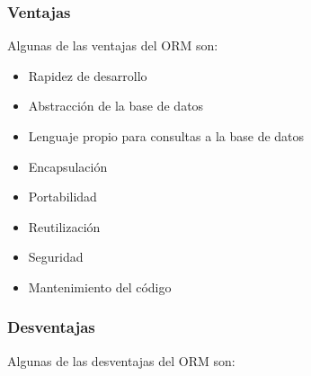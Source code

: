 \documentclass[preprint,12pt]{elsarticle}
\begin{document}
\subsubsection{\textbf{Ventajas}}
Algunas de las ventajas del ORM son: \cite{Borja2010} \cite{Polo2013} 

\begin{itemize}

	\item Rapidez de desarrollo 
	\item Abstracción de la base de datos 
	\item Lenguaje propio para consultas a la base de datos
	\item Encapsulación 
	\item Portabilidad 
	\item Reutilización
	\item Seguridad
	\item Mantenimiento del código

\end{itemize}

\subsubsection{\textbf{Desventajas}}

Algunas de las desventajas del ORM son: \cite{Borja2010} \cite{Polo2013} 
\end{document}
